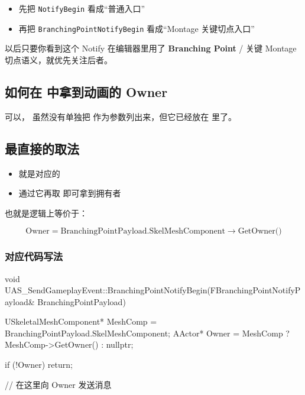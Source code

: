 \begin{itemize}
	\item 先把 \verb|NotifyBegin| 看成“普通入口”
	\item 再把 \verb|BranchingPointNotifyBegin| 看成“Montage 关键切点入口”
\end{itemize}

以后只要你看到这个 Notify 在编辑器里用了 \textbf{Branching Point} / 关键 Montage 切点语义，就优先关注后者。

\subsection{如何在  中拿到动画的 Owner}

可以， 虽然没有单独把  作为参数列出来，但它已经放在
 里了。

\subsection{最直接的取法}

\begin{itemize}
	\item {} 就是对应的 
	\item 通过它再取  即可拿到拥有者
\end{itemize}

也就是逻辑上等价于：

\[
\text{Owner} = \text{BranchingPointPayload.SkelMeshComponent} \rightarrow \text{GetOwner()}
\]

\subsubsection{对应代码写法}

\begin{code}
	void UAS_SendGameplayEvent::BranchingPointNotifyBegin(FBranchingPointNotifyPayload& BranchingPointPayload)
	{
		USkeletalMeshComponent* MeshComp = BranchingPointPayload.SkelMeshComponent;
		AActor* Owner = MeshComp ? MeshComp->GetOwner() : nullptr;
		
		if (!Owner)
		{
			return;
		}
		
		// 在这里向 Owner 发送消息
	}
\end{code}
